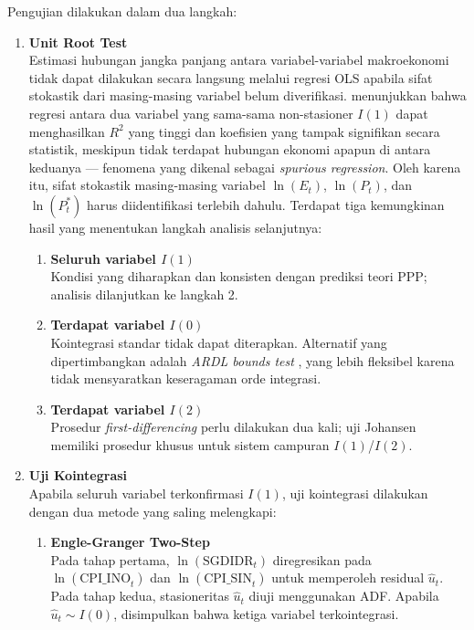 \documentclass[12pt]{article}
\begin{document}
Pengujian dilakukan dalam dua langkah:

\begin{enumerate}
    \item \textbf{Unit Root Test} \\
    Estimasi hubungan jangka panjang antara variabel-variabel makroekonomi tidak dapat dilakukan 
    secara langsung melalui regresi OLS apabila sifat stokastik dari masing-masing variabel belum 
    diverifikasi. \citet{Granger1974} menunjukkan bahwa regresi antara dua variabel yang sama-sama 
    non-stasioner $I(1)$ dapat menghasilkan $R^2$ yang tinggi dan koefisien yang tampak signifikan 
    secara statistik, meskipun tidak terdapat hubungan ekonomi apapun di antara keduanya ---
    fenomena yang dikenal sebagai \textit{spurious regression}. Oleh karena itu, sifat stokastik 
    masing-masing variabel $\ln(E_t)$, $\ln(P_t)$, dan $\ln(P^*_t)$ harus diidentifikasi terlebih 
    dahulu. Terdapat tiga kemungkinan hasil yang menentukan langkah analisis selanjutnya:

    \begin{enumerate}
        \item \textbf{Seluruh variabel $I(1)$} \\ Kondisi yang diharapkan dan konsisten dengan 
        prediksi teori PPP; analisis dilanjutkan ke langkah 2.

        \item \textbf{Terdapat variabel $I(0)$} \\ Kointegrasi standar tidak dapat diterapkan. 
        Alternatif yang dipertimbangkan adalah \textit{ARDL bounds test} \citep{Pesaran2001}, 
        yang lebih fleksibel karena tidak mensyaratkan keseragaman orde integrasi.

        \item \textbf{Terdapat variabel $I(2)$} \\ Prosedur \textit{first-differencing} perlu 
        dilakukan dua kali; uji Johansen memiliki prosedur khusus untuk sistem campuran 
        $I(1)$/$I(2)$.
    \end{enumerate}

    \item \textbf{Uji Kointegrasi} \\
    Apabila seluruh variabel terkonfirmasi $I(1)$, uji kointegrasi dilakukan dengan dua metode 
    yang saling melengkapi:

    \begin{enumerate}
        \item \textbf{Engle-Granger Two-Step} \citep{Engle1987} \\ Pada tahap pertama, 
        $\ln(\text{SGDIDR}_t)$ diregresikan pada $\ln(\text{CPI\_INO}_t)$ dan 
        $\ln(\text{CPI\_SIN}_t)$ untuk memperoleh residual $\hat{u}_t$. Pada tahap kedua, 
        stasioneritas $\hat{u}_t$ diuji menggunakan ADF. Apabila $\hat{u}_t \sim I(0)$, 
        disimpulkan bahwa ketiga variabel terkointegrasi.


\end{enumerate}
\end{enumerate}
\end{document}
